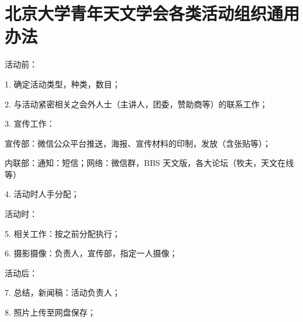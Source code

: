 \chapter{北京大学青年天文学会各类活动组织通用办法}

活动前：

1. 确定活动类型，种类，数目；

2. 与活动紧密相关之会外人士（主讲人，团委，赞助商等）的联系工作；

3. 宣传工作：

宣传部：微信公众平台推送，海报、宣传材料的印制，发放（含张贴等）；

内联部：通知：短信；网络：微信群，BBS 天文版，各大论坛（牧夫，天文在线等）

4. 活动时人手分配；

活动时：

5. 相关工作：按之前分配执行；

6. 摄影摄像：负责人，宣传部，指定一人摄像；

活动后：

7. 总结，新闻稿：活动负责人；

8. 照片上传至网盘保存；
